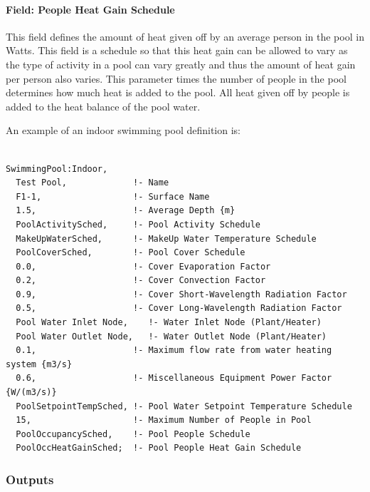 \paragraph{Field: People Heat Gain Schedule}\label{field-people-heat-gain-schedule}

This field defines the amount of heat given off by an average person in the pool in Watts. This field is a schedule so that this heat gain can be allowed to vary as the type of activity in a pool can vary greatly and thus the amount of heat gain per person also varies. This parameter times the number of people in the pool determines how much heat is added to the pool. All heat given off by people is added to the heat balance of the pool water.

An example of an indoor swimming pool definition is:

\begin{lstlisting}

SwimmingPool:Indoor,
  Test Pool,             !- Name
  F1-1,                  !- Surface Name
  1.5,                   !- Average Depth {m}
  PoolActivitySched,     !- Pool Activity Schedule
  MakeUpWaterSched,      !- MakeUp Water Temperature Schedule
  PoolCoverSched,        !- Pool Cover Schedule
  0.0,                   !- Cover Evaporation Factor
  0.2,                   !- Cover Convection Factor
  0.9,                   !- Cover Short-Wavelength Radiation Factor
  0.5,                   !- Cover Long-Wavelength Radiation Factor
  Pool Water Inlet Node,    !- Water Inlet Node (Plant/Heater)
  Pool Water Outlet Node,   !- Water Outlet Node (Plant/Heater)
  0.1,                   !- Maximum flow rate from water heating system {m3/s}
  0.6,                   !- Miscellaneous Equipment Power Factor {W/(m3/s)}
  PoolSetpointTempSched, !- Pool Water Setpoint Temperature Schedule
  15,                    !- Maximum Number of People in Pool
  PoolOccupancySched,    !- Pool People Schedule
  PoolOccHeatGainSched;  !- Pool People Heat Gain Schedule
\end{lstlisting}

\subsubsection{Outputs}\label{outputs-4-007}

